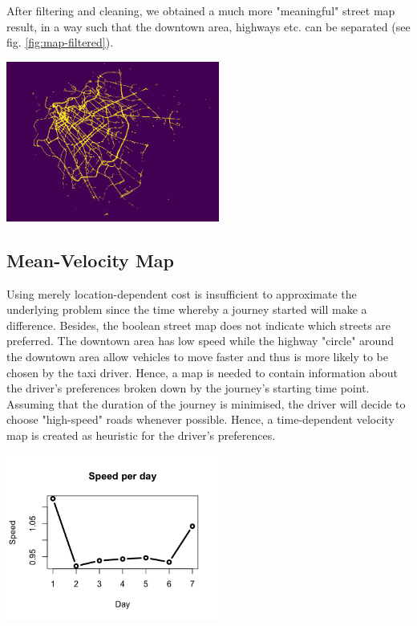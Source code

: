 \documentclass{article}
\newenvironment{Figure}
{\par\medskip\noindent\minipage{\linewidth}}
{\endminipage\par\medskip}
\begin{document}
\begin{multicols}{2}
After filtering and cleaning, we obtained a much more "meaningful" street map result, in a way such that the downtown area, highways etc. can be separated (see fig. \ref{fig:map-filtered}). 

\begin{Figure}{H}
\begin{center}
\includegraphics[width=7cm]{street_map.png}
\end{center}
\label{fig:map-filtered}
\end{Figure} 

\subsection{Mean-Velocity Map}
Using merely location-dependent cost is insufficient to approximate the underlying problem since the time whereby a journey started will make a difference. Besides, the boolean street map does not indicate which streets are preferred. The downtown area has low speed while the highway "circle" around the downtown area allow vehicles to move faster and thus is more likely to be chosen by the taxi driver. Hence, a map is needed to contain information about the driver's preferences broken down by the journey's starting time point. Assuming that the duration of the journey is minimised, the driver will decide to choose "high-speed" roads whenever possible. Hence, a time-dependent velocity map is created as heuristic for the driver's preferences. 

\begin{Figure}
\begin{center}
\includegraphics[width=7cm]{speed_per_day.png}
\end{center}
\label{fig:speed_day}
\end{Figure}


\end{multicols}
\end{document}
